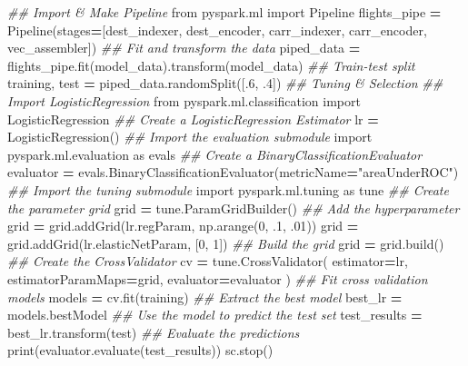\documentclass[]{book}
\newenvironment{Shaded}{\begin{snugshade}}{\end{snugshade}}
\newcommand{\DecValTok}[1]{\textcolor[rgb]{0.00,0.00,0.81}{#1}}
\newcommand{\StringTok}[1]{\textcolor[rgb]{0.31,0.60,0.02}{#1}}
\newcommand{\ImportTok}[1]{#1}
\newcommand{\CommentTok}[1]{\textcolor[rgb]{0.56,0.35,0.01}{\textit{#1}}}
\newcommand{\OperatorTok}[1]{\textcolor[rgb]{0.81,0.36,0.00}{\textbf{#1}}}
\newcommand{\BuiltInTok}[1]{#1}
\newcommand{\NormalTok}[1]{#1}
\begin{document}
\begin{Shaded}
\begin{Highlighting}[]
\CommentTok{## Import & Make Pipeline}
\ImportTok{from}\NormalTok{ pyspark.ml }\ImportTok{import}\NormalTok{ Pipeline}
\NormalTok{flights_pipe }\OperatorTok{=}\NormalTok{ Pipeline(stages}\OperatorTok{=}\NormalTok{[dest_indexer, dest_encoder, carr_indexer, carr_encoder, vec_assembler])}
\CommentTok{## Fit and transform the data}
\NormalTok{piped_data }\OperatorTok{=}\NormalTok{ flights_pipe.fit(model_data).transform(model_data)}
\CommentTok{## Train-test split}
\NormalTok{training, test }\OperatorTok{=}\NormalTok{ piped_data.randomSplit([.}\DecValTok{6}\NormalTok{, .}\DecValTok{4}\NormalTok{])}
\CommentTok{## Tuning & Selection}
\CommentTok{## Import LogisticRegression}
\ImportTok{from}\NormalTok{ pyspark.ml.classification }\ImportTok{import}\NormalTok{ LogisticRegression}
\CommentTok{## Create a LogisticRegression Estimator}
\NormalTok{lr }\OperatorTok{=}\NormalTok{ LogisticRegression()}
\CommentTok{## Import the evaluation submodule}
\ImportTok{import}\NormalTok{ pyspark.ml.evaluation }\ImportTok{as}\NormalTok{ evals}
\CommentTok{## Create a BinaryClassificationEvaluator}
\NormalTok{evaluator }\OperatorTok{=}\NormalTok{ evals.BinaryClassificationEvaluator(metricName}\OperatorTok{=}\StringTok{"areaUnderROC"}\NormalTok{)}
\CommentTok{## Import the tuning submodule}
\ImportTok{import}\NormalTok{ pyspark.ml.tuning }\ImportTok{as}\NormalTok{ tune}
\CommentTok{## Create the parameter grid}
\NormalTok{grid }\OperatorTok{=}\NormalTok{ tune.ParamGridBuilder()}
\CommentTok{## Add the hyperparameter}
\NormalTok{grid }\OperatorTok{=}\NormalTok{ grid.addGrid(lr.regParam, np.arange(}\DecValTok{0}\NormalTok{, .}\DecValTok{1}\NormalTok{, .}\DecValTok{01}\NormalTok{))}
\NormalTok{grid }\OperatorTok{=}\NormalTok{ grid.addGrid(lr.elasticNetParam, [}\DecValTok{0}\NormalTok{, }\DecValTok{1}\NormalTok{])}
\CommentTok{## Build the grid}
\NormalTok{grid }\OperatorTok{=}\NormalTok{ grid.build()}
\CommentTok{## Create the CrossValidator}
\NormalTok{cv }\OperatorTok{=}\NormalTok{ tune.CrossValidator(}
\NormalTok{estimator}\OperatorTok{=}\NormalTok{lr,}
\NormalTok{estimatorParamMaps}\OperatorTok{=}\NormalTok{grid,}
\NormalTok{evaluator}\OperatorTok{=}\NormalTok{evaluator}
\NormalTok{               )}
\CommentTok{## Fit cross validation models}
\NormalTok{models }\OperatorTok{=}\NormalTok{ cv.fit(training)}
\CommentTok{## Extract the best model}
\NormalTok{best_lr }\OperatorTok{=}\NormalTok{ models.bestModel}
\CommentTok{## Use the model to predict the test set}
\NormalTok{test_results }\OperatorTok{=}\NormalTok{ best_lr.transform(test)}
\CommentTok{## Evaluate the predictions}
\BuiltInTok{print}\NormalTok{(evaluator.evaluate(test_results))}
\NormalTok{sc.stop()}
\end{Highlighting}
\end{Shaded}
\end{document}
